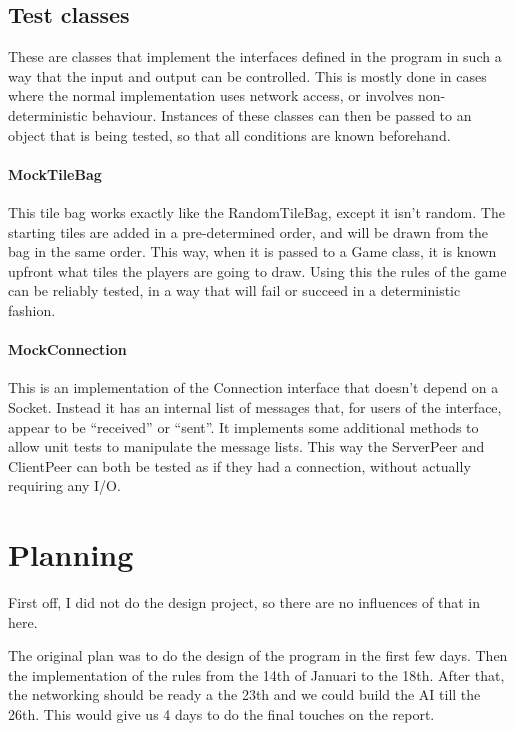 \documentclass[12pt, letterpaper]{article}
\begin{document}
    \subsection{Test classes}
    \label{subsec:testClasses}

    These are classes that implement the interfaces defined in the program in such a way that the input and output can
    be controlled.
    This is mostly done in cases where the normal implementation uses network access, or involves non-deterministic
    behaviour.
    Instances of these classes can then be passed to an object that is being tested, so that all conditions are known
    beforehand.

    \paragraph{MockTileBag}
    This tile bag works exactly like the RandomTileBag, except it isn't random.
    The starting tiles are added in a pre-determined order, and will be drawn from the bag in the same order.
    This way, when it is passed to a Game class, it is known upfront what tiles the players are going to draw.
    Using this the rules of the game can be reliably tested, in a way that will fail or succeed in a deterministic
    fashion.

    \paragraph{MockConnection}
    This is an implementation of the Connection interface that doesn't depend on a Socket.
    Instead it has an internal list of messages that, for users of the interface, appear to be ``received'' or ``sent''.
    It implements some additional methods to allow unit tests to manipulate the message lists.
    This way the ServerPeer and ClientPeer can both be tested as if they had a connection, without actually requiring
    any I/O.


    \section{Planning}
    \label{sec:planning}

    First off, I did not do the design project, so there are no influences of that in here.

    The original plan was to do the design of the program in the first few days.
    Then the implementation of the rules from the 14th of Januari to the 18th.
    After that, the networking should be ready a the 23th and we could build the AI till the 26th.
    This would give us 4 days to do the final touches on the report.
\end{document}
